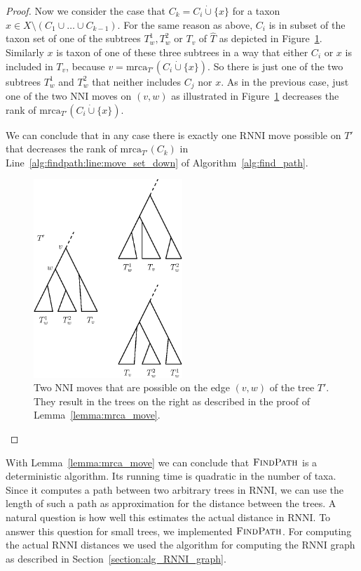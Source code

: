 \documentclass{amsart}
\newcommand{\mrca}{\mathrm{mrca}}
\newcommand{\nni}{\mathrm{NNI}}
\newcommand{\rnni}{\mathrm{RNNI}}
\newcommand{\findpath}{\textsc{FindPath}}
\begin{document}
\begin{proof}
    Now we consider the case that $C_k = C_i \dot\cup \{x\}$ for a taxon $x \in X \setminus (C_1 \cup \ldots \cup C_{k-1})$.
    For the same reason as above, $C_i$ is in subset of the taxon set of one of the subtrees $T_w^1, T_w^2$ or $T_v$ of $\hat T$ as depicted in Figure~\ref{fig:mrca_move}.
    Similarly $x$ is taxon of one of these three subtrees in a way that either $C_i$ or $x$ is included in $T_v$, because $v = \mrca_{T'}(C_i \dot \cup \{x\})$.
    So there is just one of the two subtrees $T_w^1$ and $T_w^2$ that neither includes $C_j$ nor $x$.
    As in the previous case, just one of the two $\nni$ moves on $(v,w)$ as illustrated in Figure~\ref{fig:mrca_move} decreases the rank of $\mrca_{T'}(C_i \dot \cup \{x\})$.

    We can conclude that in any case there is exactly one $\rnni$ move possible on $T'$ that decreases the rank of $\mrca_{T'}(C_k)$ in Line~\ref{alg:findpath:line:move_set_down} of Algorithm~\ref{alg:find_path}.

    \begin{figure}[H]
    	\centering
    	\includegraphics[width=0.5\textwidth]{mrca_move}
        \vspace{12pt}
        \caption{Two $\nni$ moves that are possible on the edge $(v,w)$ of the tree $T'$.
        They result in the trees on the right as described in the proof of Lemma~\ref{lemma:mrca_move}.}
    	\label{fig:mrca_move}
    \end{figure}

\end{proof}

With Lemma~\ref{lemma:mrca_move} we can conclude that $\findpath$ is a deterministic algorithm.
Its running time is quadratic in the number of taxa.
Since it computes a path between two arbitrary trees in $\rnni$, we can use the length of such a path as approximation for the distance between the trees.
A natural question is how well this estimates the actual distance in $\rnni$.
To answer this question for small trees, we implemented $\findpath$.
For computing the actual $\rnni$ distances we used the algorithm for computing the $\rnni$ graph as described in Section~\ref{section:alg_RNNI_graph}.
\end{document}
